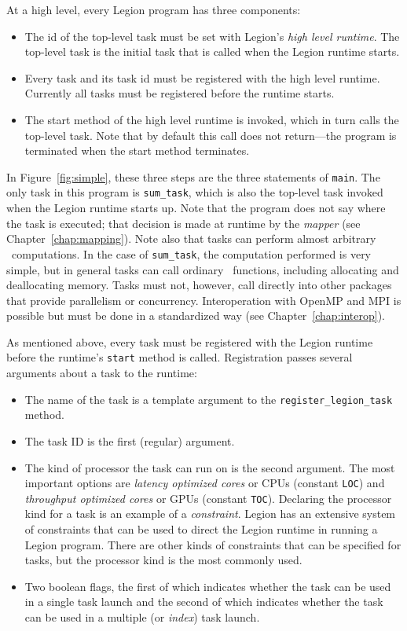 At a high level, every Legion program has three components:
\begin{itemize}
\item The id of the top-level task must be set with Legion's {\em high level runtime}.  The top-level
task is the initial task that is called when the Legion runtime starts.
\item Every task and its task id must be registered with the high level runtime.  Currently all tasks
must be registered before the runtime starts.
\item The start method of the high level runtime is invoked, which in turn calls the top-level task.
Note that by default this call does not return---the program is terminated when the start method terminates.
\end{itemize}
In Figure~\ref{fig:simple}, these three steps are the three statements of {\tt main}.  
The only task in this program is {\tt sum\_task}, which is also the top-level task invoked when the
Legion runtime starts up.  Note that the program does not say where the task is executed; that decision is made
at runtime by the {\em mapper} (see Chapter~\ref{chap:mapping}).  Note also that tasks can perform almost arbitrary
\Cpp\ computations.  In the case of {\tt sum\_task}, the computation performed is very simple, but in general tasks
can call ordinary \Cpp\ functions, including allocating and deallocating memory.  Tasks must not, however,
call directly into other packages that provide parallelism or concurrency.  Interoperation with OpenMP and MPI is
possible but must be done in a standardized way (see Chapter~\ref{chap:interop}).  

As mentioned above, every task must be registered with the Legion runtime before
the runtime's {\tt start} method is called.  Registration passes several arguments about a
task to the runtime:
\begin{itemize}
\item The name of the task is a template argument to the {\tt register\_legion\_task} method.

\item The task ID is the first (regular) argument.

\item The kind of processor the task can run on is the second argument.  The most important options are
{\em latency optimized cores} or CPUs (constant {\tt LOC}) and {\em throughput optimized cores} or GPUs
(constant {\tt TOC}).  Declaring the processor kind for a task is an example of a {\em constraint}.
Legion has an extensive system of constraints that can be used to direct the Legion runtime 
in running a Legion program.  There are other kinds of constraints that can be specified for tasks, but
the processor kind is the most commonly used.

\item Two boolean flags, the first of which indicates whether the task can be used in a single task
launch and the second of which indicates whether the task can be used in a multiple (or {\em index}) task
launch.
\end{itemize}

